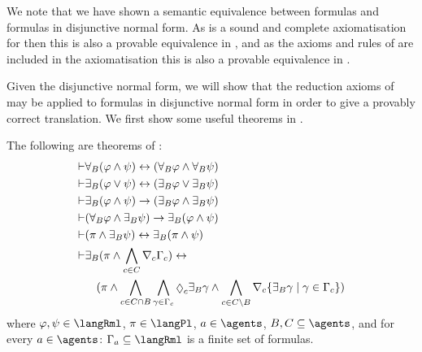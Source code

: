 
We note that we have shown a semantic equivalence between \langMl{} formulas and formulas in disjunctive normal form.
As \axiomK{} is a sound and complete axiomatisation for \logicK{} then this is also a provable equivalence in \axiomK{}, and as the axioms and rules of \axiomK{} are included in the axiomatisation \axiomRmlK{} this is also a provable equivalence in \axiomRmlK{}.

Given the disjunctive normal form, we will show that the reduction axioms of \axiomRmlK{} may be applied to formulas in disjunctive normal form in order to give a provably correct translation.
We first show some useful theorems in \axiomRmlK{}.

\begin{lemma}\label{rml-k-theorems}
The following are theorems of \axiomRmlK{}:
\begin{align}
    \proves & \allrefsBs (\phi \land \psi) \iff (\allrefsBs \phi \land \allrefsBs \psi) \label{rml-k-and}\\
    \proves & \somerefsBs (\phi \lor \psi) \iff (\somerefsBs \phi \lor \somerefsBs \psi) \label{rml-k-or}\\
    \proves & \somerefsBs (\phi \land \psi) \implies (\somerefsBs \phi \land \somerefsBs \psi) \label{rml-k-d-and}\\
    \proves & (\allrefsBs \phi \land \somerefsBs \psi) \implies \somerefsBs (\phi \land \psi) \label{rml-k-db-and}\\
    \proves & (\pi \land \somerefsBs \psi) \iff \somerefsBs (\pi \land \psi) \label{rml-k-pd-and}\\
    \proves & \displaystyle \somerefsBs (\pi \land \bigwedge_{\agentC \in \agentsC} \coverC \Gamma_\agentC) \iff \nonumber\\
            & \displaystyle \quad
            (
            \pi \land
            \bigwedge_{\agentC \in \agentsC \cap \agentsB} \bigwedge_{\gamma \in \Gamma_\agentC} \possibleC \somerefsBs \gamma \land
            \bigwedge_{\agentC \in \agentsC \setminus \agentsB} \coversC \{\somerefsBs \gamma \mid \gamma \in \Gamma_\agentC\} 
            ) \label{rml-k-cover}
\end{align}
where $\phi, \psi \in \langRml$, $\pi \in \langPl$, $\agentA \in \agents$, $\agentsB, \agentsC \subseteq \agents$, and for every $\agentA \in \agents$: $\Gamma_\agentA \subseteq \langRml$ is a finite set of formulas.
\end{lemma}

